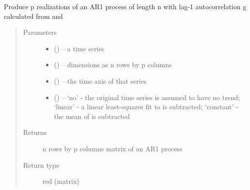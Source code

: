 \documentclass[letterpaper,10pt,english]{sphinxmanual}
\begin{document}
\begin{fulllineitems}
\label{\detokenize{Spectral:pyleoclim.Spectral.ar1_sim}}
Produce p realizations of an AR1 process of length n with lag-1 autocorrelation g calculated from  and 
\begin{quote}\begin{description}
\item[{Parameters}] \leavevmode\begin{itemize}
\item {} 
 () -- a time series

\item {} 
 (\sphinxstyleliteralemphasis{,}\sphinxstyleliteralemphasis{}) -- dimensions as n rows by p columns

\item {} 
 () -- the time axis of that series

\item {} 
 () -- `no' - the original time series is assumed to have no trend;
`linear' - a linear least-squares fit to  is subtracted;
`constant' - the mean of  is subtracted

\end{itemize}

\item[{Returns}] \leavevmode
n rows by p columns matrix of an AR1 process

\item[{Return type}] \leavevmode
red (matrix)

\end{description}\end{quote}

\end{fulllineitems}

\end{document}
